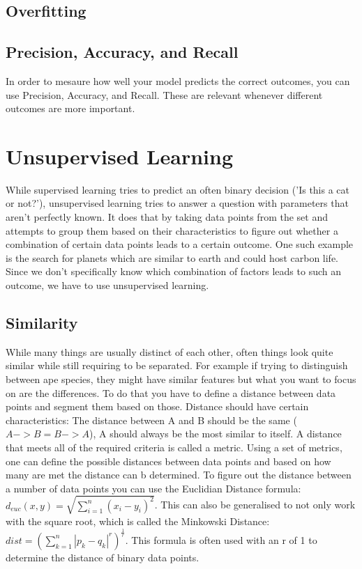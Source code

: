 \documentclass{article}
\begin{document}
	\subsection{Overfitting}
	\subsection{Precision, Accuracy, and Recall}
	In order to mesaure how well your model predicts the correct outcomes, you can use Precision, Accuracy, and Recall. These are relevant whenever different outcomes are more important.
	\section{Unsupervised Learning}
	While supervised learning tries to predict an often binary decision ('Is this a cat or not?'), unsupervised learning tries to answer a question with parameters that aren't perfectly known. It does that by taking data points from the set and attempts to group them based on their characteristics to figure out whether a combination of certain data points leads to a certain outcome. One such example is the search for planets which are similar to earth and could host carbon life. Since we don't specifically know which combination of factors leads to such an outcome, we have to use unsupervised learning.
	\subsection{Similarity}
	While many things are usually distinct of each other, often things look quite similar while still requiring to be separated. For example if trying to distinguish between ape species, they might have similar features but what you want to focus on are the differences. To do that you have to define a distance between data points and segment them based on those. Distance should have certain characteristics: The distance between A and B should be the same ($A->B = B->A$), A should always be the most similar to itself. A distance that meets all of the required criteria is called a metric. Using a set of metrics, one can define the possible distances between data points and based on how many are met the distance can b determined. To figure out the distance between a number of data points you can use the Euclidian Distance formula: $d_{euc}(x,y)=\sqrt{\sum_{i=1}^n(x_i-y_i)^2}$. This can also be generalised to not only work with the square root, which is called the Minkowski Distance: $dist=(\sum^n_{k=1}|p_k-q_k|^r)^{\frac{1}{r}}$. This formula is often used with an r of 1 to determine the distance of binary data points.
\end{document}
